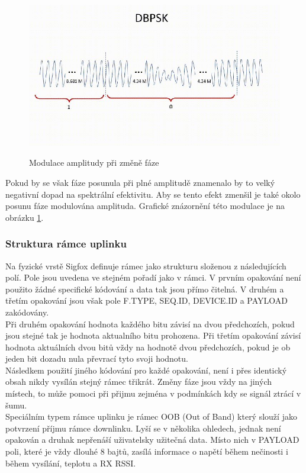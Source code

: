\documentclass{ctuthesis}
\begin{document}
\begin{figure}
\caption{Modulace amplitudy při změně fáze \cite{sigfoxprotocol}}
\includegraphics[width=1\textwidth]{./images/dbpsk_sigfox.jpg}
\label{dbpsk_sigfox}
\end{figure}
Pokud by se však fáze posunula při plné amplitudě znamenalo by to velký negativní dopad na spektrální efektivitu. Aby se tento efekt zmenšil je také okolo posunu fáze modulována amplituda. Grafické znázornění této modulace je na obrázku \ref{dbpsk_sigfox}.\\

\subsubsection{Struktura rámce uplinku}
Na fyzické vrstě Sigfox definuje rámec jako strukturu složenou z následujících polí. Pole jsou uvedena ve stejném pořadí jako v rámci. V prvním opakování není použito žádné specifické kódování a data tak jsou přímo čitelná. V druhém a třetím opakování jsou však pole F.TYPE, SEQ.ID, DEVICE.ID a PAYLOAD zakódovány.\\
Při druhém opakování hodnota každého bitu závisí na dvou předchozích, pokud jsou stejné tak je hodnota aktualního bitu prohozena. Při třetím opakování závisí hodnota aktuálních dvou bitů vždy na hodnotě dvou předchozích, pokud je ob jeden bit dozadu nula převrací tyto svoji hodnotu.\\
Následkem použití jiného kódování pro každé opakování, není i přes identický obsah nikdy vysílán stejný rámec třikrát. Změny fáze jsou vždy na jiných místech, to může pomoci při přijmu zejména v podmínkách kdy se signál ztrácí v šumu.\\
Speciálním typem rámce uplinku je rámec OOB (Out of Band) který slouží jako potvrzení příjmu rámce downlinku. Lyší se v několika ohledech, jednak není opakován a druhak nepřenáší uživatelsky užitečná data. Místo nich v PAYLOAD poli, které je vždy dlouhé 8 bajtů, zasílá informace o napětí během nečinosti i během vysílání, teplotu a RX RSSI.
\end{document}
